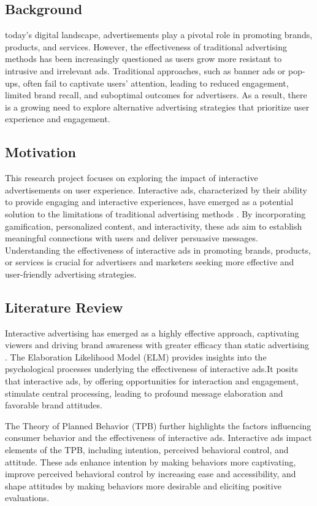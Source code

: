 \documentclass[journal]{IEEEtran}
\begin{document}
\subsection{Background}
 today's digital landscape, advertisements play a pivotal role in promoting brands,
products, and services. However, the effectiveness of traditional advertising methods
has been increasingly questioned as users grow more resistant to intrusive and
irrelevant ads\cite{shavitt1998public}. Traditional approaches, such as
banner ads or pop-ups, often fail to captivate users' attention, leading to reduced
engagement, limited brand recall, and suboptimal outcomes for advertisers. As a result,
there is a growing need to explore alternative advertising strategies that prioritize
user experience and engagement.

\subsection{Motivation}
This research project focuses on exploring the impact of interactive advertisements on user experience.
Interactive ads, characterized by their ability to provide engaging and interactive experiences,
have emerged as a potential solution to the limitations of traditional advertising methods \cite{roy2020role}.
By incorporating gamification, personalized content, and interactivity, these ads aim to establish
meaningful connections with users and deliver persuasive messages. Understanding the effectiveness
of interactive ads in promoting brands, products, or services is crucial for advertisers and
marketers seeking more effective and user-friendly advertising strategies.

\subsection{Literature Review}
Interactive advertising has emerged as a highly effective approach, captivating viewers and driving
brand awareness with greater efficacy than static advertising \cite{petty1986communication}. The Elaboration
Likelihood Model (ELM) provides insights into the psychological processes underlying the effectiveness
of interactive ads.It posits that interactive ads, by offering opportunities for interaction and
engagement, stimulate central processing, leading to profound message elaboration and favorable brand attitudes.

The Theory of Planned Behavior (TPB) further highlights the factors influencing consumer behavior
and the effectiveness of interactive ads\cite{ajzen1991theory}. Interactive ads impact elements of the TPB, including
intention, perceived behavioral control, and attitude. These ads enhance intention by making behaviors more
captivating, improve perceived behavioral control by increasing ease and accessibility, and shape attitudes
by making behaviors more desirable and eliciting positive evaluations.
\end{document}
